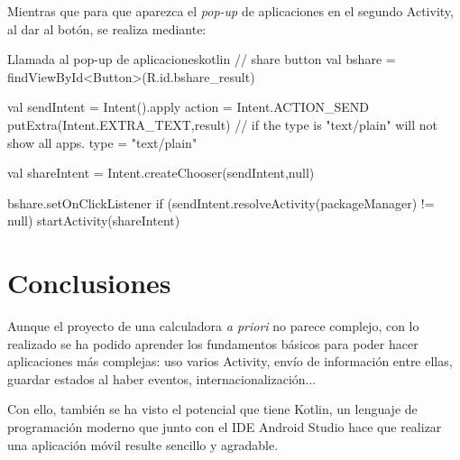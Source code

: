 \documentclass{\ClassPath/viu-tfm-template}
\begin{document}
Mientras que para que aparezca el \textit{pop-up} de aplicaciones en el segundo Activity, al dar al botón, se realiza mediante:

\begin{mycode}{Llamada al pop-up de aplicaciones}{kotlin}{}
// share button
val bshare = findViewById<Button>(R.id.bshare_result)

val sendIntent = Intent().apply {
    action = Intent.ACTION_SEND
    putExtra(Intent.EXTRA_TEXT,result)
    // if the type is "text/plain" will not show all apps.
    type = "text/plain"
}

val shareIntent = Intent.createChooser(sendIntent,null)

bshare.setOnClickListener {
    if (sendIntent.resolveActivity(packageManager) != null) {
        startActivity(shareIntent)
    }
}
\end{mycode}


\chapter{Conclusiones}

Aunque el proyecto de una calculadora \textit{a priori} no parece complejo, con lo realizado se ha podido aprender los fundamentos básicos para poder hacer aplicaciones más complejas: uso varios Activity, envío de información entre ellas, guardar estados al haber eventos, internacionalización...

Con ello, también se ha visto el potencial que tiene Kotlin, un lenguaje de programación moderno que junto con el IDE Android Studio hace que realizar una aplicación móvil resulte sencillo y agradable.
\end{document}
